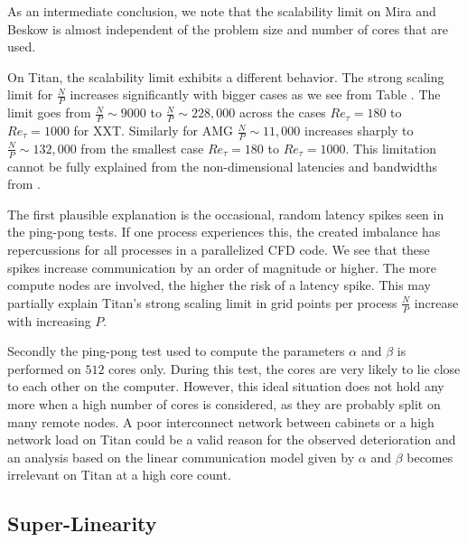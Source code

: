 \documentclass{sig-alternate}
\begin{document}
As an intermediate conclusion, we note that the scalability limit on Mira and Beskow is almost independent of the problem size and number of cores that are used. 

On Titan, the scalability limit exhibits a different behavior.
The strong scaling limit for $\frac{N}{P}$ increases
significantly with bigger cases as we see from Table .
The limit goes from $\frac{N}{P} \sim 9000$ to $\frac{N}{P} \sim 228,000$ across the cases $Re_{\tau}=180$ to $Re_{\tau}=1000$ for XXT. Similarly for AMG $\frac{N}{P}  \sim 11,000$ increases sharply to $\frac{N}{P} \sim 132,000$ from the smallest case $Re_{\tau}=180$ to 
$Re_{\tau}=1000$. This limitation cannot be fully explained from the non-dimensional latencies and bandwidths from . %

The first plausible explanation is the occasional, random latency spikes seen in the ping-pong tests. If
one process experiences this, the created imbalance has repercussions for all
processes in a parallelized CFD code. We see that these spikes increase communication by
an order of magnitude or higher. The more compute nodes are involved, the higher
the risk of a latency spike. This may partially explain Titan's strong
scaling limit in grid points per process $\frac{N}{P}$ increase with increasing $P$.

Secondly the ping-pong test used to compute the parameters $\alpha$ and $\beta$ is performed on $512$ cores only. During this test, the cores are very likely to lie close to each other on the computer. 
However, this ideal situation does not hold any more when a high number of cores
is considered, as they are probably split on many remote nodes.
A poor interconnect network between cabinets or a high network load on Titan 
could be a valid reason for the observed deterioration and an analysis based on the linear communication model given by  
$\alpha$ and $\beta$  becomes irrelevant on Titan at a high core count.



\subsection{Super-Linearity}
\end{document}
